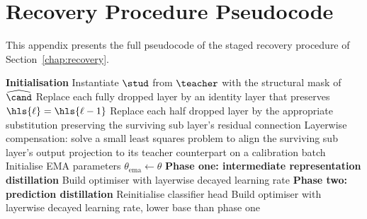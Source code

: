 \section{Recovery Procedure Pseudocode}
\label{app:recovery_pseudocode}

This appendix presents the full pseudocode of the staged recovery procedure of Section~\ref{chap:recovery}.

\begin{algorithm}[h]
\SetAlgoLined
\DontPrintSemicolon
{}
\BlankLine
\textbf{Initialisation} \;
Instantiate $\stud$ from $\teacher$ with the structural mask of $\widehat{\cand}$ \;
Replace each fully dropped layer by an identity layer that preserves $\hls{\ell} = \hls{\ell - 1}$ \;
Replace each half dropped layer by the appropriate substitution preserving the surviving sub layer's residual connection \;
Layerwise compensation: solve a small least squares problem to align the surviving sub layer's output projection to its teacher counterpart on a calibration batch \;
Initialise EMA parameters $\theta_{\mathrm{ema}} \leftarrow \theta$ \;
\BlankLine
\textbf{Phase one: intermediate representation distillation} \;
Build optimiser with layerwise decayed learning rate \;
\BlankLine
\textbf{Phase two: prediction distillation} \;
Reinitialise classifier head \;
Build optimiser with layerwise decayed learning rate, lower base than phase one \;
\end{algorithm}
